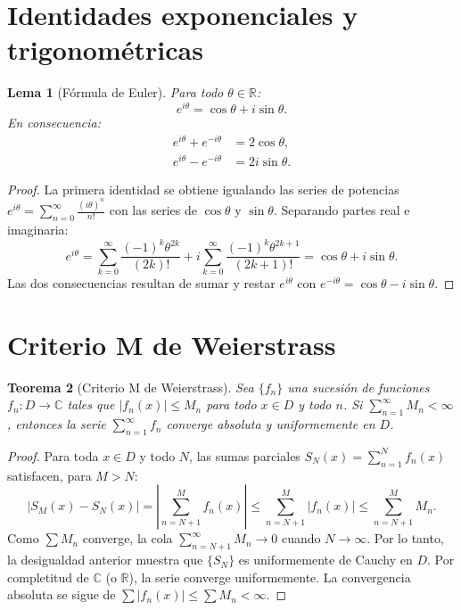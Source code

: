 \documentclass[a4paper,11pt]{report}
\newtheorem{theorem}{Teorema}[chapter]
\newtheorem{lemma}[theorem]{Lema}
\begin{document}
\section{Identidades exponenciales y trigonométricas}

\begin{lemma}[Fórmula de Euler]\label{lem:euler}
Para todo $\theta \in \mathbb{R}$:
\[
e^{i\theta} = \cos\theta + i\sin\theta.
\]
En consecuencia:
\begin{align*}
e^{i\theta} + e^{-i\theta} &= 2\cos\theta, \\
e^{i\theta} - e^{-i\theta} &= 2i\sin\theta.
\end{align*}
\end{lemma}

\begin{proof}
La primera identidad se obtiene igualando las series de potencias $e^{i\theta} = \sum_{n=0}^\infty \frac{(i\theta)^n}{n!}$ con las series de $\cos\theta$ y $\sin\theta$. Separando partes real e imaginaria:
\[
e^{i\theta} = \sum_{k=0}^\infty \frac{(-1)^k \theta^{2k}}{(2k)!} + i \sum_{k=0}^\infty \frac{(-1)^k \theta^{2k+1}}{(2k+1)!} = \cos\theta + i\sin\theta.
\]
Las dos consecuencias resultan de sumar y restar $e^{i\theta}$ con $e^{-i\theta} = \cos\theta - i\sin\theta$.
\end{proof}

\section{Criterio M de Weierstrass}

\begin{theorem}[Criterio M de Weierstrass]\label{thm:weierstrass_m}
Sea $\{f_n\}$ una sucesión de funciones $f_n: D \to \mathbb{C}$ tales que $|f_n(x)| \leq M_n$ para todo $x \in D$ y todo $n$. Si $\sum_{n=1}^\infty M_n < \infty$, entonces la serie $\sum_{n=1}^\infty f_n$ converge absoluta y uniformemente en $D$.
\end{theorem}

\begin{proof}
Para toda $x \in D$ y todo $N$, las sumas parciales $S_N(x) = \sum_{n=1}^N f_n(x)$ satisfacen, para $M > N$:
\[
|S_M(x) - S_N(x)| = \left|\sum_{n=N+1}^{M} f_n(x)\right| \leq \sum_{n=N+1}^{M} |f_n(x)| \leq \sum_{n=N+1}^{M} M_n.
\]
Como $\sum M_n$ converge, la cola $\sum_{n=N+1}^\infty M_n \to 0$ cuando $N \to \infty$. Por lo tanto, la desigualdad anterior muestra que $\{S_N\}$ es uniformemente de Cauchy en $D$. Por completitud de $\mathbb{C}$ (o $\mathbb{R}$), la serie converge uniformemente. La convergencia absoluta se sigue de $\sum |f_n(x)| \leq \sum M_n < \infty$.
\end{proof}
\end{document}
